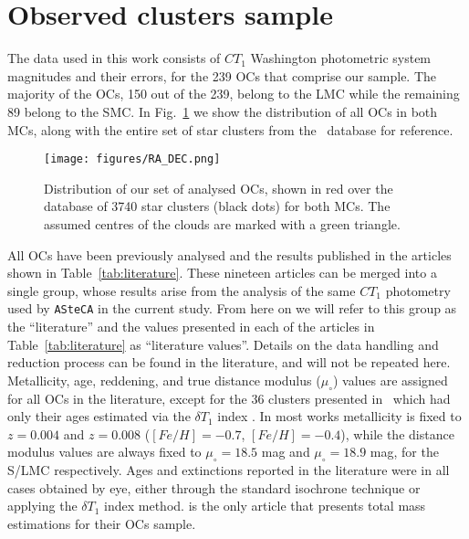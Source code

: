 \documentclass[a4paper,fleqn,usenatbib]{mnras}
\begin{document}

\section{Observed clusters sample}
\label{sec:clust-sample}

The data used in this work consists of $CT_1$ Washington photometric system
magnitudes and their errors, for the 239 OCs that comprise our sample.
The majority of the OCs, 150 out of the 239, belong to the LMC while the
remaining 89 belong to the SMC.
%
In Fig.~\ref{fig:ra-dec} we show the distribution of all OCs in both MCs,
along with the entire set of star clusters from the~\cite{Bica_2008} database
for reference.

\begin{figure}
\texttt{[image: figures/RA\_DEC.png]}
\caption[Pass this otherwise it chokes with the cite]{Distribution of our set of
analysed OCs, shown in red over the~\cite{Bica_2008} database of 3740
star clusters (black dots) for both MCs. The assumed centres of the clouds are
marked with a green triangle.}
\label{fig:ra-dec}
\end{figure}


All OCs have been previously analysed and the results published in the articles
shown in Table~\ref{tab:literature}.
These nineteen articles can be merged into a single group, whose results
arise from the analysis of the same $CT_1$ photometry used by \texttt{ASteCA} in the
current study. From here on we will refer to this group as the ``literature''
and the values presented in each of the articles in Table~\ref{tab:literature}
as ``literature values''.
Details on the data handling and reduction process can be found in the
literature, and will not be repeated here.
%
Metallicity, age, reddening, and true distance modulus ($\mu_{\circ}$) values
are assigned for all OCs in the literature, except for the 36 clusters presented
in~\cite{Piatti_2011b} which had only their ages estimated via the $\delta T_1$
index \citep{Phelps_1994,Geisler_1997}.
In most works metallicity is fixed to $z=0.004$ and $z=0.008$ ($[Fe/H]=-0.7$,
$[Fe/H]=-0.4$), while the distance modulus values are always fixed to
$\mu_{\circ}{=}18.5$ mag and $\mu_{\circ}{=}18.9$ mag, for the S/LMC
respectively.
Ages and extinctions reported in the literature were in all cases obtained by
eye, either through the standard isochrone technique or applying the
$\delta T_1$ index method.
%
\cite{Maia_2013} is the only article that presents total mass estimations for
their OCs sample.
\end{document}
